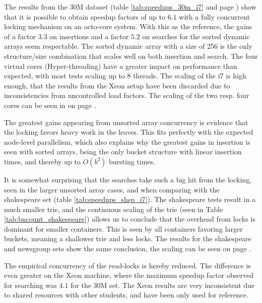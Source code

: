 The results from the 30M dataset (table \ref{tab:speedups_30m_i7} and page
\pageref{fig:ts_i7_30m}) show that it
is possible to obtain speedup factors of up to $6.1$ with a fully concurrent
locking mechanism on an octo-core system. With this as the reference, the gains of
a factor $3.3$ on insertions and a factor $5.2$ on searches for the sorted dynamic
arrays seem respectable. The sorted dynamic array with a size of 256 is the
only structure/size combination that scales well on both insertion and search. The
four virtual cores (Hyper-threading) have a greater impact on performance than
expected, with most tests scaling up to 8 threads. The scaling of the i7 is
high enough, that the results from the Xeon setup have been discarded due to
inconsistencies from uncontrolled load factors. The scaling of the two resp.
four cores can be seen in on page \pageref{fig:ts_shsp}.

The greatest gains appearing from unsorted array concurrency is evidence that
the locking favors heavy work in the leaves. This fits perfectly with the
expected node-level parallelism, which also explains why the greatest gains in
insertion is seen with sorted arrays, being the only bucket structure with
linear insertion times, and thereby up to $O(b^2)$ bursting times.

It is somewhat surprising that the searches take such a big hit from the
locking, seen in the larger unsorted array cases, and when comparing with
the shakespeare set (table \ref{tab:speedups_shsp_i7}). The shakespeare tests
result in a much smaller trie, and the continuous scaling of the trie (seen in
Table \ref{tab:bncount_shakespeare}) allows us to conclude that the overhead
from locks is dominant for smaller containers. This is seen by all containers
favoring larger buckets, meaning a shallower trie and less locks. The results
for the shakespeare and newsgroup sets show the same conclusion, the scaling
    can be seen on page \pageref{fig:ts_i7_nsgrp}.

The empirical concurrency of the read-locks is hereby reduced. The difference
is even greater on the Xeon machine, where the maximum speedup factor observed
for searching was $4.1$ for the 30M set. The Xeon results are very inconsistent
    due to shared resources with other students, and have been only used for
    reference.
